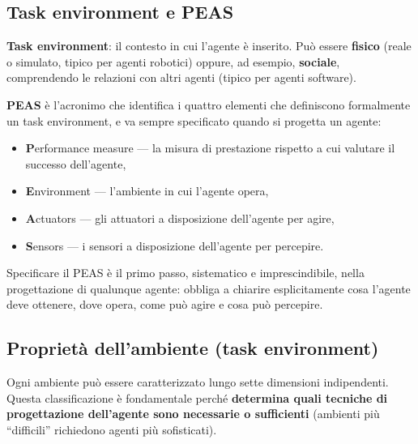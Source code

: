 \documentclass[11pt,a4paper]{report}
\begin{document}
\subsection{Task environment e PEAS}

\textbf{Task environment}: il contesto in cui l'agente è inserito. Può essere \textbf{fisico} (reale o simulato, tipico per agenti robotici) oppure, ad esempio, \textbf{sociale}, comprendendo le relazioni con altri agenti (tipico per agenti software).

\textbf{PEAS} è l'acronimo che identifica i quattro elementi che definiscono formalmente un task environment, e va sempre specificato quando si progetta un agente:
\begin{itemize}
  \item \textbf{P}erformance measure --- la misura di prestazione rispetto a cui valutare il successo dell'agente,
  \item \textbf{E}nvironment --- l'ambiente in cui l'agente opera,
  \item \textbf{A}ctuators --- gli attuatori a disposizione dell'agente per agire,
  \item \textbf{S}ensors --- i sensori a disposizione dell'agente per percepire.
\end{itemize}

Specificare il PEAS è il primo passo, sistematico e imprescindibile, nella progettazione di qualunque agente: obbliga a chiarire esplicitamente cosa l'agente deve ottenere, dove opera, come può agire e cosa può percepire.

\subsection{Proprietà dell'ambiente (task environment)}

Ogni ambiente può essere caratterizzato lungo sette dimensioni indipendenti. Questa classificazione è fondamentale perché \textbf{determina quali tecniche di progettazione dell'agente sono necessarie o sufficienti} (ambienti più ``difficili'' richiedono agenti più sofisticati).
\end{document}
